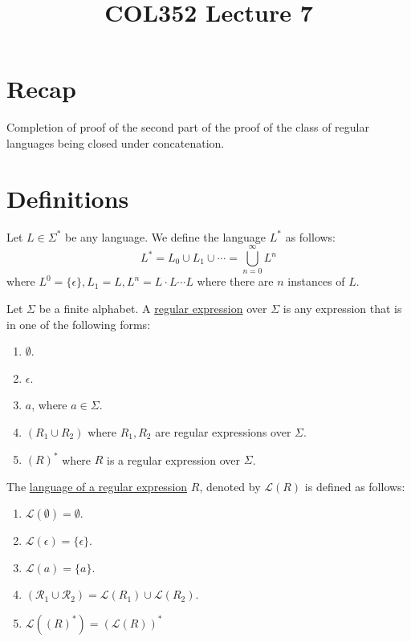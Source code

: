 \documentclass[a4paper]{article}
\title{\textbf{COL352 Lecture 7}}
\date{}
\newcommand{\mc}{\mathcal}
\begin{document}
\maketitle
\tableofcontents

\section{Recap}

Completion of proof of the second part of the proof of the class of regular languages being closed under concatenation.

\section{Definitions}

\begin{defn}
    Let $L \in \Sigma^*$ be any language. We define the language $L^*$ as follows:
    \[
        L^* = L_0 \cup L_1 \cup \cdots = \bigcup_{n=0}^\infty L^n
    \]
    where $L^0 = \{\epsilon\}, L_1 = L, L^n = L\cdot L \cdots L$ where there are $n$ instances of $L$.
\end{defn}

\begin{defn}
    Let $\Sigma$ be a finite alphabet. A \underline{regular expression} over $\Sigma$ is any expression that is in one of the following forms:
    \begin{enumerate}
        \item $\emptyset$.
        \item $\epsilon$.
        \item $a$, where $a \in \Sigma$.
        \item $(R_1 \cup R_2)$ where $R_1, R_2$ are regular expressions over $\Sigma$.
        \item $(R)^*$ where $R$ is a regular expression over $\Sigma$.
    \end{enumerate}
\end{defn}

\begin{defn}
    The \underline{language of a regular expression} $R$, denoted by $\mc{L}(R)$ is defined as follows:
    \begin{enumerate}
        \item $\mc{L}(\emptyset) = \emptyset$.
        \item $\mc{L}(\epsilon) = \{\epsilon\}$.
        \item $\mc{L}(a) = \{a\}$.
        \item $\mc{(R_1 \cup R_2)} = \mc{L}(R_1) \cup \mc{L}(R_2)$.
        \item $\mc{L}\left((R)^*\right) = \left(\mc{L}(R)\right)^*$
    \end{enumerate}
\end{defn}
\end{document}

